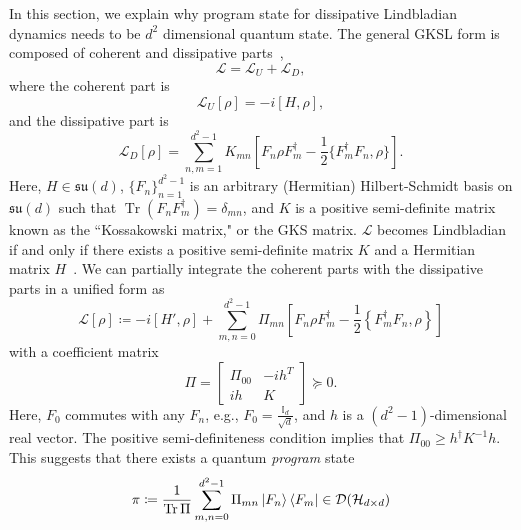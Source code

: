\documentclass[superscriptaddress,amsmath,amssymb,aps,pra,letterpaper,tightenlines,notitlepages,12pt]{revtex4-2}
\begin{document}
\label{appendix:state2dyn}

In this section, we explain why program state for dissipative Lindbladian dynamics needs to be $d^2$ dimensional quantum state. The general GKSL form is composed of coherent and dissipative parts~\cite{gorini1976CompletelyPositiveDynamical, lindblad1976GeneratorsQuantumDynamical},
\begin{equation}
    \mathcal{L} = \mathcal{L}_U + \mathcal{L}_D,
\end{equation}
where the coherent part is
\begin{equation}
    \mathcal{L}_U[\rho] = -i[H, \rho],
\end{equation}
and the dissipative part is
\begin{equation}
    \mathcal{L}_D[\rho] = \sum_{n,m=1}^{d^2-1}K_{mn}\left[F_n\rho F_m^\dagger - \frac{1}{2}\{F_m^\dagger F_n, \rho\}\right].
\end{equation}
Here, $H\in\mathfrak{su}(d)$, $\{F_n\}_{n=1}^{d^2-1}$ is an arbitrary (Hermitian) Hilbert-Schmidt basis on $\mathfrak{su}(d)$ such that $\operatorname{Tr}(F_nF_m^\dagger)=\delta_{mn}$, and $K$ is a positive semi-definite matrix known as the ``Kossakowski matrix," or the GKS matrix. $\mathcal{L}$ becomes Lindbladian if and only if there exists a positive semi-definite matrix $K$ and a Hermitian matrix $H$~\cite{sweke2015UniversalSimulationMarkovian, childs2023EfficientSimulationSparse, denisov2019UniversalSpectraRandom}. We can partially integrate the coherent parts with the dissipative parts in a unified form as
\begin{equation}
    \mathcal{L}[\rho]\coloneq-i[H',\rho]+\sum_{m,n=0}^{d^2-1} \Pi_{mn} \left[F_n\rho F_m^\dagger-\frac{1}{2}\left\{F_m^\dagger F_n, \rho\right\}\right]
\end{equation}
with a coefficient matrix
\begin{equation}
    \Pi=\begin{bmatrix}
        \Pi_{00} & -ih^T \\
        ih & K
    \end{bmatrix}\succeq0.
\end{equation}
Here, $F_0$ commutes with any $F_n$, e.g., $F_0=\tfrac{\mathbb{I}_d}{\sqrt{d}}$, and $h$ is a $(d^2-1)$-dimensional real vector. The positive semi-definiteness condition implies that $\Pi_{00}\geq h^\dagger K^{-1}h$. This suggests that there exists a quantum \emph{program} state
\begin{equation}\label{eq:progdef}
    \pi\coloneq\frac{1}{\operatorname{Tr}\Pi}\sum_{m,n=0}^{d^2-1}{\Pi_{mn}}\ket{F_n}\bra{F_m}\in\mathcal{D}(\mathcal{H}_{d\times d})
\end{equation}
\end{document}
